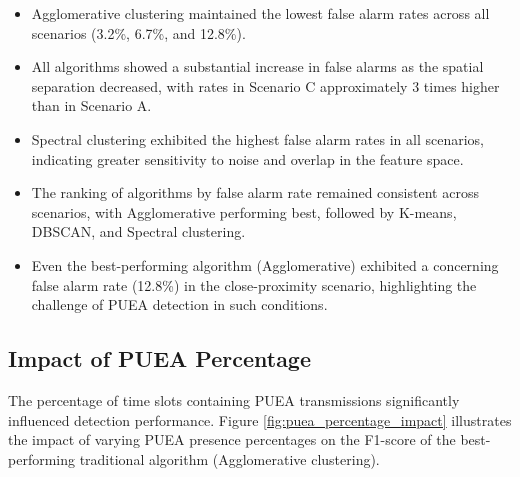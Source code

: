 \begin{itemize}
    \item Agglomerative clustering maintained the lowest false alarm rates across all scenarios (3.2\%, 6.7\%, and 12.8\%).
    
    \item All algorithms showed a substantial increase in false alarms as the spatial separation decreased, with rates in Scenario C approximately 3 times higher than in Scenario A.
    
    \item Spectral clustering exhibited the highest false alarm rates in all scenarios, indicating greater sensitivity to noise and overlap in the feature space.
    
    \item The ranking of algorithms by false alarm rate remained consistent across scenarios, with Agglomerative performing best, followed by K-means, DBSCAN, and Spectral clustering.
    
    \item Even the best-performing algorithm (Agglomerative) exhibited a concerning false alarm rate (12.8\%) in the close-proximity scenario, highlighting the challenge of PUEA detection in such conditions.
\end{itemize}

\subsection{Impact of PUEA Percentage}

The percentage of time slots containing PUEA transmissions significantly influenced detection performance. Figure \ref{fig:puea_percentage_impact} illustrates the impact of varying PUEA presence percentages on the F1-score of the best-performing traditional algorithm (Agglomerative clustering).

